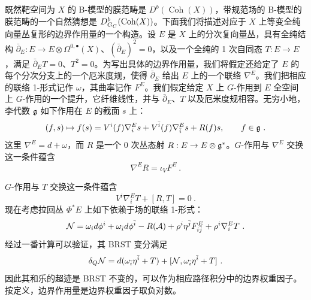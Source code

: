 
既然靶空间为 $X$ 的 B-模型的膜范畴是 $D^b(\operatorname{Coh}(X))$，带规范场的 B-模型的膜范畴的一个自然猜想是 $D^b_{G_C}(\operatorname{Coh}(X))$。下面我们将描述对应于 $X$ 上等变全纯向量丛复形的边界作用量的一个构造。设 $E$ 是 $X$ 上的分次复向量丛，具有全纯结构 $\bar\partial_E:E\to E\otimes\Omega^{0,\bullet}(X)$、$(\bar\partial_E)^2=0$，以及一个全纯的 1 次自同态 $T:E\to E$，满足 $\bar\partial_ET=0$、$T^2=0$。为写出具体的边界作用量，我们将假定还给定了 $E$ 的每个分次分支上的一个厄米度规，使得 $\bar\partial_E$ 给出 $E$ 上的一个联络 $\nabla^E$。我们把相应的联络 1-形式记作 $\omega$，其曲率记作 $F^E$。我们假定给定 $X$ 上 $G$-作用到 $E$ 全空间上 $G$-作用的一个提升，它纤维线性，并与 $\bar\partial_E$、$T$ 以及厄米度规相容。无穷小地，李代数 $\mathfrak{g}$ 如下作用在 $E$ 的截面 $s$ 上：
\[ (f,s)\mapsto f(s) = V^i(f)\nabla^E_i s + V^{\bar i}(f)\nabla^E_{\bar i}s + R(f)s, \qquad f\in\mathfrak{g} \ . \]
这里 $\nabla^E=d+\omega$，而 $R$ 是一个 0 次丛态射 $R:E\to E\otimes\mathfrak{g}^*$。$G$-作用与 $\nabla^E$ 交换这一条件蕴含
\[ \nabla^ER = \iota_VF^E \ . \]


$G$-作用与 $T$ 交换这一条件蕴含
\[ V^i\nabla^E_iT + [R,T] = 0 \ . \]
现在考虑拉回丛 $\Phi^*E$ 上如下依赖于场的联络 1-形式：
\[ \mathcal{N} = \omega_id\phi^i + \omega_{\bar i}d\phi^{\bar i} - R(\mathcal{A}) + \rho^i\eta^{\bar j}F^E_{i\bar j} + \rho^i\nabla^E_iT \ . \]
经过一番计算可以验证，其 BRST 变分满足
\[ \delta_Q\mathcal{N} = d(\omega_{\bar i}\eta^{\bar i} + T) + [\mathcal{N}, \omega_{\bar i}\eta^{\bar i} + T] \ . \]
因此其和乐的超迹是 BRST 不变的，可以作为相应路径积分中的边界权重因子。按定义，边界作用量是边界权重因子取负对数。


